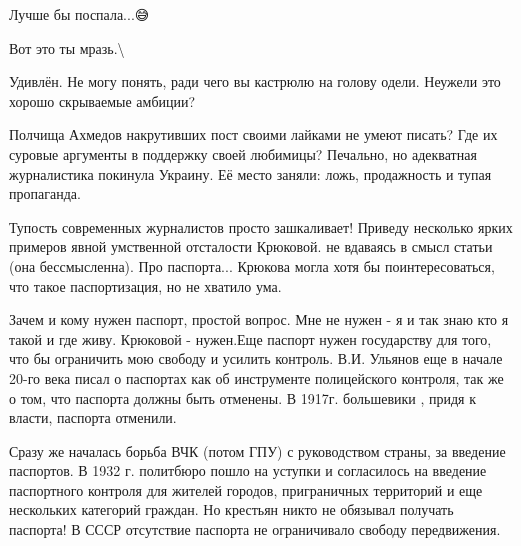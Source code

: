 \begin{itemize}
Лучше бы поспала...😅

 
Вот это ты мразь.\textbackslash

 
Удивлён. Не могу понять, ради чего вы кастрюлю на голову одели. Неужели это хорошо скрываемые амбиции?

 

Полчища Ахмедов накрутивших пост своими лайками не умеют писать? Где их суровые
аргументы в поддержку своей любимицы? Печально, но адекватная журналистика
покинула Украину. Её место заняли: ложь, продажность и тупая пропаганда.

 

Тупость современных журналистов просто зашкаливает! Приведу несколько ярких
примеров явной умственной отсталости Крюковой. не вдаваясь в смысл статьи (она
бессмысленна). Про паспорта... Крюкова могла хотя бы поинтересоваться, что
такое паспортизация, но не хватило ума. 

Зачем и кому нужен паспорт, простой вопрос. Мне не нужен - я и так знаю кто я
такой и где живу. Крюковой - нужен.Еще паспорт нужен государству для того, что
бы ограничить мою свободу и усилить контроль. В.И. Ульянов еще в начале 20-го
века писал о паспортах как об инструменте полицейского контроля, так же о том,
что паспорта должны быть отменены. В 1917г. большевики , придя к власти,
паспорта отменили. 

Сразу же началась борьба ВЧК (потом ГПУ) с руководством страны, за введение
паспортов. В 1932 г. политбюро пошло на уступки и согласилось на введение
паспортного контроля для жителей городов, приграничных территорий и еще
нескольких категорий граждан. Но крестьян никто не обязывал получать паспорта!
В СССР отсутствие паспорта не ограничивало свободу передвижения. 


\end{itemize}
